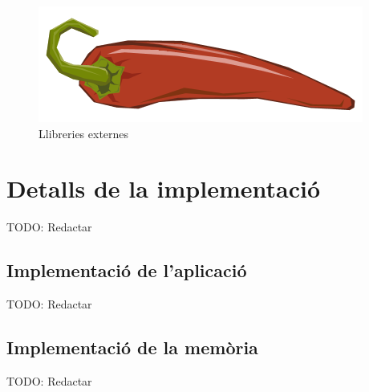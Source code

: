 \begin{figure}[H]
\includegraphics[scale=0.25]{Figures/lombok.png}
\caption{Llibreries externes}
\end{figure}


\clearpage
\section{Detalls de la implementació}

TODO: Redactar

\subsection{Implementació de l'aplicació}

TODO: Redactar

\subsection{Implementació de la memòria}

TODO: Redactar
